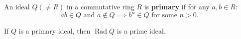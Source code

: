 An ideal $Q (\neq R)$ in a commutative ring $R$ is \textbf{primary} if for any $a, b \in R$:
\[
ab \in Q \text{ and } a \notin Q \implies b^n \in Q \text{ for some } n > 0.
\]

If $Q$ is a primary ideal, then $\operatorname{Rad} Q$ is a prime ideal.
